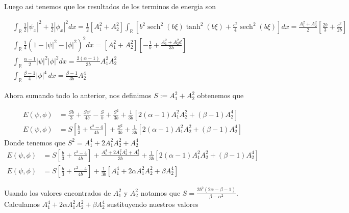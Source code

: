 \documentclass[letterpaper,11pt]{exam}
\newcommand{\R}{\mathbb R}
\newcommand{\sech}{\operatorname{sech}}
\theoremstyle{plain}
\begin{document}
Luego asi tenemos que los resultados de los terminos de energia son

\begin{align*}
    &\int_{\mathbb{R}} \frac{1}{2}|\psi_x|^2 + \frac{1}{2}|\phi_x|^2 dx= \frac{1}{2}[A_1^2+A_2^2]\int_\R [b^2\sech^2(b\xi)\tanh^2(b\xi)+\frac{c^2} {4}\sech^2(b\xi)]dx =\frac{A_1^2+A_2^2}{2}\left [\frac{2b}{3} + \frac{c^2}{2b}\right ] \\
    &\int_\R \frac{1}{4}(1 - |\psi|^2 - |\phi|^2)^2 dx=[A_1^2+A_2^2]\left [-\frac{1}{b}+\frac{A_1^2+A_2^2d}{3b}\right] \\
     &\int_\R \frac{\alpha - 1}{2}|\psi|^2|\phi|^2 dx =\frac{2(\alpha - 1)}{3b}A_1^2A_2^2 \\
     &\int_\R \frac{\beta - 1}{4}|\phi|^4 \, dx =\frac{\beta - 1}{3b}A_2^4
\end{align*}

Ahora sumando todo lo anterior, nos definimos $S:=A_1^2+A_2^2$ obtenemos que 

\begin{align*}
   E(\psi,\phi)&= \frac{Sb}{3}+\frac{Sc^2}{4b}-\frac{S}{b}+\frac{S^2}{3b}+\frac{1}{3b}[2(\alpha-1)A_1^2A_2^2+(\beta-1)A_2^4] \\
   E(\psi,\phi)&= S\left [ \frac{b}{3} + \frac{c^2-4}{4b}\right]+\frac{S^2}{3b} +\frac{1}{3b}[2(\alpha-1)A_1^2A_2^2+(\beta-1)A_2^4] 
\end{align*}
Donde tenemos que $S^2=A_1^4+2A_1^2A_2^2+A_2^4$
\begin{align*}
   E(\psi,\phi)&= S\left [ \frac{b}{3} + \frac{c^2-4}{4b}\right]+\frac{A_1^4+2A_1^2A_2^2+A_2^4}{3b} +\frac{1}{3b}[2(\alpha-1)A_1^2A_2^2+(\beta-1)A_2^4] \\
    E(\psi,\phi)&= S\left [ \frac{b}{3} + \frac{c^2-4}{4b}\right] +\frac{1}{3b}[A_1^4+2\alpha A_1^2A_2^2+\beta A_2^4] 
\end{align*}

Usando los valores encontrados de $A_1^2$ y $A_2^2$ notamos que $S=\frac{2b^2(2\alpha-\beta-1)}{\beta-\alpha^2}$. Calculamos $A_1^4 + 2\alpha A_1^2A_2^2 + \beta A_2^4$ sustituyendo nuestros valores 
\end{document}

